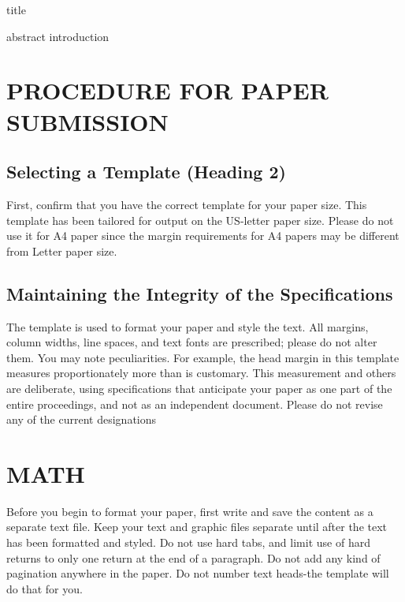 \documentclass[letterpaper, 10 pt, conference]{ieeeconf}  %
\begin{document}
{title}

\maketitle
\thispagestyle{empty}
\pagestyle{empty}


{abstract}
{introduction}


\section{PROCEDURE FOR PAPER SUBMISSION}

\subsection{Selecting a Template (Heading 2)}

First, confirm that you have the correct template for your paper size. This template has been tailored for output on the US-letter paper size. Please do not use it for A4 paper since the margin requirements for A4 papers may be different from Letter paper size.

\subsection{Maintaining the Integrity of the Specifications}

The template is used to format your paper and style the text. All margins, column widths, line spaces, and text fonts are prescribed; please do not alter them. You may note peculiarities. For example, the head margin in this template measures proportionately more than is customary. This measurement and others are deliberate, using specifications that anticipate your paper as one part of the entire proceedings, and not as an independent document. Please do not revise any of the current designations

\section{MATH}

Before you begin to format your paper, first write and save the content as a separate text file. Keep your text and graphic files separate until after the text has been formatted and styled. Do not use hard tabs, and limit use of hard returns to only one return at the end of a paragraph. Do not add any kind of pagination anywhere in the paper. Do not number text heads-the template will do that for you.
\end{document}
